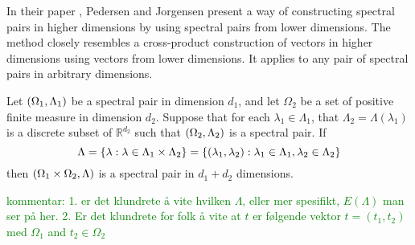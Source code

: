 \documentclass[../thesis.tex]{subfiles}
\begin{document}
In their paper \cite{jorgensenSpectralPairsCartesian2001}, Pedersen and Jorgensen present a way of constructing spectral pairs in higher dimensions by using spectral pairs from lower dimensions. The method closely resembles a cross-product construction of vectors in higher dimensions using vectors from lower dimensions. It applies to any pair of spectral pairs in arbitrary dimensions. 
\begin{theorem}\label{thrm:construction_spectra}
    Let $(\Omega_1,\Lambda_1)$ be a spectral pair in dimension $d_1$, and let $\Omega_2$ be a set of positive finite measure in dimension $d_2$. Suppose that for each $\lambda_1 \in \Lambda_1$, that $\Lambda_2=\Lambda(\lambda_1)$ is a discrete subset of $\mathbb{R}^{d_2}$ such that $(\Omega_2,\Lambda_2)$ is a spectral pair. If 
    \begin{equation}
        \Lambda = \{\lambda: \lambda \in  \Lambda_1 \times \Lambda_2\} = \{(\lambda_1, \lambda_2): \lambda_1\in \Lambda_1, \lambda_2 \in \Lambda_2\} 
    \end{equation}
    then $(\Omega_1\times\Omega_2, \Lambda)$ is a spectral pair in $d_1+d_2$ dimensions. 
\end{theorem}
\textcolor{green}{kommentar: 1. er det klundrete å vite hvilken $\Lambda$, eller mer spesifikt, $E(\Lambda)$ man ser på her. 2. Er det klundrete for folk å vite at $t$ er følgende vektor $t = (t_1,t_2)$ med $\Omega_1$ and $t_2 \in \Omega_2$}
\end{document}
